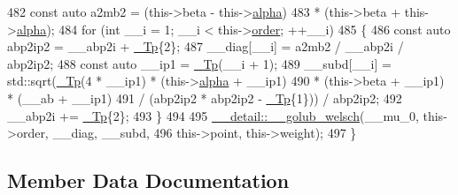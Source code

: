 \begin{DoxyCode}
482       \textcolor{keyword}{const} \textcolor{keyword}{auto} a2mb2 = (this->beta - this->\hyperlink{struct____gnu__cxx_1_1fixed__gauss__jacobi__integral_a2d9b81150e8fed046b6753551e9ce0e1}{alpha})
483                         * (this->beta + this->\hyperlink{struct____gnu__cxx_1_1fixed__gauss__jacobi__integral_a2d9b81150e8fed046b6753551e9ce0e1}{alpha});
484       \textcolor{keywordflow}{for} (\textcolor{keywordtype}{int} \_\_i = 1; \_\_i < this->\hyperlink{struct____gnu__cxx_1_1fixed__gauss__jacobi__integral_ae5f494962a95203a0f799f039e4b6b33}{order}; ++\_\_i)
485         \{
486           \textcolor{keyword}{const} \textcolor{keyword}{auto} abp2ip2 = \_\_abp2i + \hyperlink{namespace____gnu__cxx_a3b19a9c800ca194374ef9172290f7d79}{\_Tp}\{2\};
487           \_\_diag[\_\_i] = a2mb2 / \_\_abp2i / abp2ip2;
488           \textcolor{keyword}{const} \textcolor{keyword}{auto} \_\_ip1 = \hyperlink{namespace____gnu__cxx_a3b19a9c800ca194374ef9172290f7d79}{\_Tp}(\_\_i + 1);
489           \_\_subd[\_\_i] = std::sqrt(\hyperlink{namespace____gnu__cxx_a3b19a9c800ca194374ef9172290f7d79}{\_Tp}(4 * \_\_ip1) * (this->\hyperlink{struct____gnu__cxx_1_1fixed__gauss__jacobi__integral_a2d9b81150e8fed046b6753551e9ce0e1}{alpha} + \_\_ip1)
490                                   * (this->beta + \_\_ip1) * (\_\_ab + \_\_ip1)
491                                   / (abp2ip2 * abp2ip2 - \hyperlink{namespace____gnu__cxx_a3b19a9c800ca194374ef9172290f7d79}{\_Tp}\{1\})) / abp2ip2;
492           \_\_abp2i += \hyperlink{namespace____gnu__cxx_a3b19a9c800ca194374ef9172290f7d79}{\_Tp}\{2\};
493         \}
494 
495       \hyperlink{namespace____gnu__cxx_1_1____detail_aa9f299bb7c04606a9a9aab3ab9e4f4c8}{\_\_detail::\_\_golub\_welsch}(\_\_mu\_0, this->order, \_\_diag, \_\_subd,
496                                this->point, this->weight);
497     \}
\end{DoxyCode}


\subsection{Member Data Documentation}
\mbox{\label{struct____gnu__cxx_1_1fixed__gauss__jacobi__integral_a2d9b81150e8fed046b6753551e9ce0e1}} 
